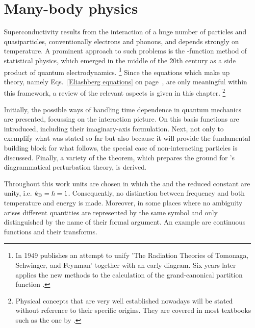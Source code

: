 
\chapter{Many-body physics}

Superconductivity results from the interaction of a huge number of particles and
quasiparticles, conventionally electrons and phonons, and depends strongly on
temperature. A prominent approach to such problems is the -function
method of statistical physics, which emerged in the middle of the 20th century
as a side product of quantum electrodynamics.%
%
\footnote{In 1949  publishes an attempt to unify \q'The Radiation
Theories of Tomonaga, Schwinger, and Feynman' \cite{Dyson49} together with an
early  diagram. Six years later  applies the new
methods to the calculation of the grand-canonical partition function
\cite{Matsubara55}.}
%
Since the equations which make up  theory, namely
Eqs.~\ref{Eliashberg equations} on page~\pageref{Eliashberg equations}, are only
meaningful within this framework, a review of the relevant aspects is given in
this chapter.%
%
\footnote{Physical concepts that are very well established nowadays will be
stated without reference to their specific origins. They are covered in most
textbooks such as the one by  \cite{Mahan}.}

Initially, the possible ways of handling time dependence in quantum mechanics
are presented, focussing on the interaction picture. On this basis 
functions are introduced, including their imaginary-axis formulation. Next, not
only to exemplify what was stated so far but also because it will provide the
fundamental building block for what follows, the special case of non-interacting
particles is discussed. Finally, a variety of the  theorem, which
prepares the ground for 's diagrammatical perturbation theory, is
derived.

Throughout this work units are chosen in which the  and the
reduced  constant are unity, i.e. $k \sb{\text{B}} = \hbar = 1$.
Consequently, no distinction between frequency and both temperature and energy
is made. Moreover, in some places where no ambiguity arises different quantities
are represented by the same symbol and only distinguished by the name of their
formal argument. An example are continuous functions and their 
transforms.

